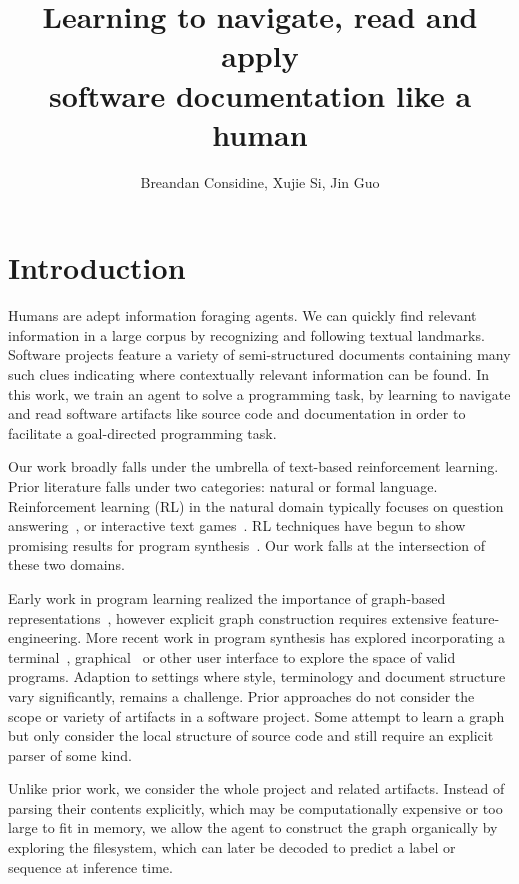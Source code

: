 \documentclass[11pt]{article}
\title{Learning to navigate, read and apply\\software documentation like a human}
\author{Breandan Considine, Xujie Si, Jin Guo}
\begin{document}
\maketitle

\section{Introduction}

Humans are adept information foraging agents. We can quickly find relevant information in a large corpus by recognizing and following textual landmarks. Software projects feature a variety of semi-structured documents containing many such clues indicating where contextually relevant information can be found. In this work, we train an agent to solve a programming task, by learning to navigate and read software artifacts like source code and documentation in order to facilitate a goal-directed programming task.

Our work broadly falls under the umbrella of text-based reinforcement learning. Prior literature falls under two categories: natural or formal language. Reinforcement learning (RL) in the natural domain typically focuses on question answering~\cite{buck2017ask, chen2019reinforcement}, or interactive text games~\cite{he2015deep,ammanabrolu2018playing,narasimhan2015language,guo2020interactive,ammanabrolu2020graph}. RL techniques have begun to show promising results for program synthesis~\cite{ellis2019write, johnson2020learning, chen2020program}. Our work falls at the intersection of these two domains.

Early work in program learning realized the importance of graph-based representations~\cite{allamanis2017learning}, however explicit graph construction requires extensive feature-engineering. More recent work in program synthesis has explored incorporating a terminal~\cite{ellis2019write}, graphical~\cite{walke2020learning} or other user interface to explore the space of valid programs. Adaption to settings where style, terminology and document structure vary significantly, remains a challenge. Prior approaches do not consider the scope or variety of artifacts in a software project. Some attempt to learn a graph~\cite{johnson2020learning} but only consider the local structure of source code and still require an explicit parser of some kind.

Unlike prior work, we consider the whole project and related artifacts. Instead of parsing their contents explicitly, which may be computationally expensive or too large to fit in memory, we allow the agent to construct the graph organically by exploring the filesystem, which can later be decoded to predict a label or sequence at inference time.
\end{document}
